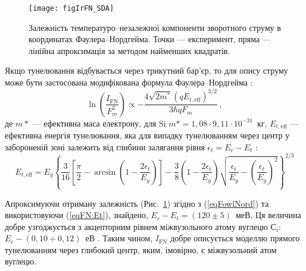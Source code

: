 \begin{figure}
\center
\texttt{[image: figIrFN\_SDA]}
\caption{\label{figIrFN_SDA}
Залежність температуро--незалежної компоненти зворотного струму
в координатах Фаулера--Нордгейма.
Точки --- експеримент, пряма --- лінійна апроксимація за методом найменших квадратів.
}%
\end{figure}

Якщо тунелювання відбувається через трикутний бар'єр, то для опису струму може бути застосована
модифікована формула Фаулера--Нордгейма  \cite{Rhoderick1988,Novikov,Kurnosova}:
\begin{equation}\label{eqFowlNord}
    \ln\left(\frac{I_\mathrm{FN}}{F_m^2}\right)\propto -\frac{4 \sqrt{2m^*}(qE_{t,\mathrm{eff}})^{3/2}}{3\hbar q F_m}\,,
\end{equation}
де
$m*$ ---  ефективна маса електрону,
для Si $m* = 1,08\cdot9,11\cdot10^{-31}$~кг,
$E_{t,\mathrm{eff}}$ --- ефективна енергія тунелювання,
яка для випадку тунелюванням через центр у забороненій зоні залежить від глибини залягання рівня $\epsilon_t=E_c-E_t$ \cite{Kurnosova,Bulyarskii2001r}:
\begin{equation}\label{eqFN:Et}
    E_{t,\mathrm{eff}}=E_g\left\{\frac{3}{16}\left[\frac{\pi}{2}-
     \arcsin\left(1-\frac{2\epsilon_t}{E_g}\right)\right]-\frac{3}{8}\left(1-\frac{2\epsilon_t}{E_g}\right)
     \sqrt{\frac{\epsilon_t}{E_g}-\left(\frac{\epsilon_t}{E_g}\right)^2}\right\}^{2/3}
\end{equation}


Апроксимуючи отриману залежність (Рис.~\ref{figIrFN_SDA}) згідно з (\ref{eqFowlNord}) та використовуючи (\ref{eqFN:Et}),
знайдено, $E_c-E_t=(120\pm5)$~меВ.
Ця величина добре узгоджується з акцепторним рівнем міжвузольного атому вуглецю С$_i$: $E_c-(0,10\div0,12)$~еВ \cite{Vavilov1990r,Song1987}.
Таким чином, $I_\mathrm{FN}$ добре описується моделлю прямого тунелюванням через глибокий центр, яким, імовірно, є міжвузольний атом вуглецю.

